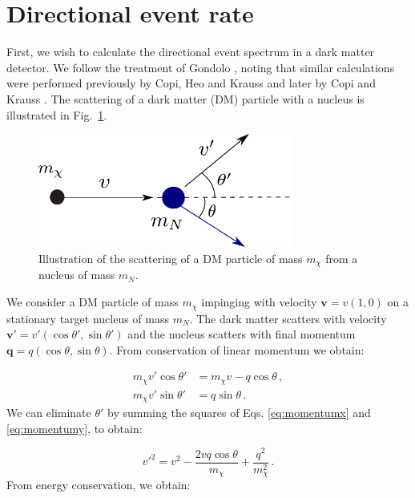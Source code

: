 \section{Directional event rate}

First, we wish to calculate the directional event spectrum in a dark matter detector. We follow the treatment of Gondolo \cite{Gondolo:2002}, noting that similar calculations were performed previously by Copi, Heo and Krauss \cite{Copi:1999} and later by Copi and Krauss \cite{Copi:2002}. The scattering of a dark matter (DM) particle with a nucleus is illustrated in Fig.~\ref{fig:directional:scattering}. 

\begin{figure}[h!]
  \centering
  \includegraphics[width=0.75\textwidth]{Directional/Scattering.pdf}
\caption[Illustration of DM-nucleus scattering]{Illustration of the scattering of a DM particle of mass $m_\chi$ from a nucleus of mass $m_N$.}
  \label{fig:directional:scattering}
\end{figure}

We consider a DM particle of mass \(m_\chi\) impinging with velocity \(\textbf{v} = v\left(1,0\right)\) on a stationary target nucleus of mass \(m_N\). The dark matter scatters with velocity \(\textbf{v}' = v'\left(\cos \theta',\sin \theta'\right)\) and the nucleus scatters with final momentum \(\textbf{q} = q\left(\cos \theta, \sin \theta\right)\). From conservation of linear momentum we obtain:

\begin{align}
m_\chi v' \cos \theta' &= m_\chi v - q\cos \theta \,, \label{eq:momentumx}\\
m_\chi v' \sin \theta' &= q \sin \theta \,. \label{eq:momentumy}
\end{align}
We can eliminate \(\theta'\) by summing the squares of Eqs. \ref{eq:momentumx} and \ref{eq:momentumy}, to obtain:

\begin{equation}
v'^2 = v^2 - \frac{2 v q \cos \theta}{m_\chi} + \frac{q^2}{m_\chi^2}\,.
\end{equation}
From energy conservation, we obtain:

